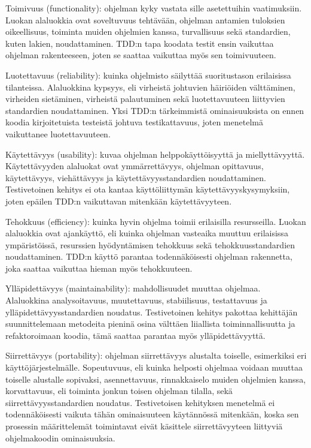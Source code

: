 \documentclass[finnish]{tktltiki2}
\theoremstyle{definition}
\theoremstyle{remark}
\begin{document}
Toimivuus (functionality): ohjelman kyky vastata sille asetettuihin vaatimuksiin.  Luokan alaluokkia ovat soveltuvuus tehtävään, ohjelman antamien tuloksien oikeellisuus, toiminta muiden ohjelmien kanssa, turvallisuus sekä standardien, kuten lakien, noudattaminen. TDD:n tapa koodata testit ensin vaikuttaa ohjelman rakenteeseen, joten se saattaa vaikuttaa myös sen toimivuuteen.

Luotettavuus (reliability): kuinka ohjelmisto säilyttää suoritustason erilaisissa tilanteissa. Alaluokkina kypsyys, eli virheistä johtuvien häiriöiden välttäminen, virheiden sietäminen, virheistä palautuminen sekä luotettavuuteen liittyvien standardien noudattaminen. Yksi TDD:n tärkeimmistä ominaisuuksista on ennen koodia kirjoitetuista testeistä johtuva testikattavuus, joten menetelmä vaikuttanee luotettavuuteen.

 Käytettävyys (usability): kuvaa ohjelman helppokäyttöisyyttä ja miellyttävyyttä. Käytettävyyden alaluokat ovat ymmärrettävyys, ohjelman opittavuus, käytettävyys, viehättävyys ja käytettävyysstandardien noudattaminen. Testivetoinen kehitys ei ota kantaa käyttöliittymän käytettävyyskysymyksiin, joten epäilen TDD:n vaikuttavan mitenkään käytettävyyteen.

Tehokkuus (efficiency): kuinka hyvin ohjelma toimii erilaisilla resursseilla. Luokan alaluokkia ovat ajankäyttö, eli kuinka ohjelman vasteaika muuttuu erilaisissa ympäristöissä, resurssien hyödyntämisen tehokkuus sekä tehokkuusstandardien noudattaminen. TDD:n käyttö parantaa todennäköisesti ohjelman rakennetta, joka saattaa vaikuttaa hieman myös tehokkuuteen.

Ylläpidettävyys (maintainability): mahdollisuudet muuttaa ohjelmaa. Alaluokkina analysoitavuus, muutettavuus, stabiilisuus, testattavuus ja ylläpidettävyysstandardien noudatus. Testivetoinen kehitys pakottaa kehittäjän suunnittelemaan metodeita pieninä osina välttäen liiallista toiminnallisuutta ja refaktoroimaan koodia, tämä saattaa parantaa myös ylläpidettävyyttä.

Siirrettävyys (portability): ohjelman siirrettävyys alustalta toiselle, esimerkiksi eri käyttöjärjestelmälle. Sopeutuvuus, eli kuinka helposti ohjelmaa voidaan muuttaa toiselle alustalle sopivaksi, asennettavuus, rinnakkaiselo muiden ohjelmien kanssa, korvattavuus, eli toiminta jonkun toisen ohjelman tilalla, sekä siirrettävyysstandardien noudatus. Testivetoisen kehityksen menetelmä ei todennäköisesti vaikuta tähän ominaisuuteen käytännössä mitenkään, koska sen prosessin määrittelemät toimintavat eivät käsittele siirrettävyyteen liittyviä ohjelmakoodin ominaisuuksia.
\end{document}
